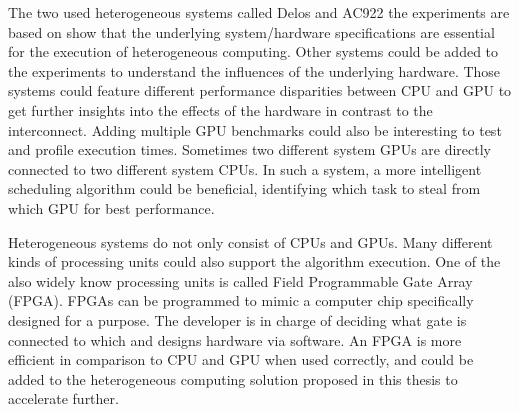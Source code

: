 The two used heterogeneous systems called Delos and AC922 the experiments are based on show that the underlying system/hardware specifications are essential for the execution of heterogeneous computing. Other systems could be added to the experiments to understand the influences of the underlying hardware. Those systems could feature different performance disparities between CPU and GPU to get further insights into the effects of the hardware in contrast to the interconnect. Adding multiple GPU benchmarks could also be interesting to test and profile execution times. Sometimes two different system GPUs are directly connected to two different system CPUs. In such a system, a more intelligent scheduling algorithm could be beneficial, identifying which task to steal from which GPU for best performance.

Heterogeneous systems do not only consist of CPUs and GPUs. Many different kinds of processing units could also support the algorithm execution. One of the also widely know processing units is called Field Programmable Gate Array (FPGA). FPGAs can be programmed to mimic a computer chip specifically designed for a purpose. The developer is in charge of deciding what gate is connected to which and designs hardware via software. An FPGA is more efficient in comparison to CPU and GPU when used correctly, \cite{qasaimehComparingEnergyEfficiency2019} and could be added to the heterogeneous computing solution proposed in this thesis to accelerate further.
% 